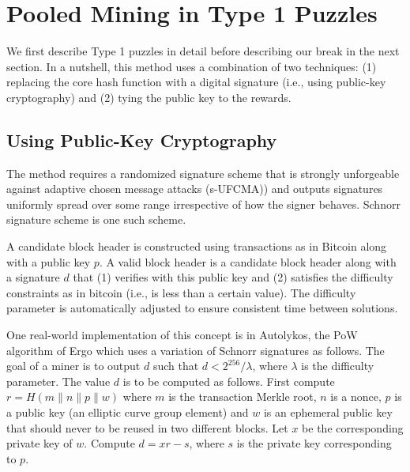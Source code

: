 \documentclass[11pt]{article}
\newcommand{\authnote}[2]{\marginpar{\parbox{\marginparwidth}{\tiny %
  \textsf{#1 {\textcolor{blue}{notes: #2}}}}}%
  \textcolor{blue}{\textbf{\dag}}}
\newcommand{\authnote}[2]{
  \textsf{#1 \textcolor{blue}{: #2}}}
\newcommand{\authnote}[2]{}
\newcommand{\snote}[1]{{\authnote{\textcolor{yellow}{Scalahub notes}}{#1}}}
\newcommand{\powname}{Autolykos\xspace}
\begin{document}
\section{Pooled Mining in Type 1 Puzzles}


We first describe Type 1 puzzles in detail before describing our break in the next section.
In a nutshell, this method uses a combination of two techniques: (1) replacing the core hash function with a digital signature (i.e., using public-key cryptography) and (2) tying the public key to the rewards. 

\subsection{Using Public-Key Cryptography}

The method requires a randomized signature scheme that is strongly unforgeable against adaptive chosen message attacks (s-UFCMA)) and outputs signatures uniformly spread over some range irrespective of how the signer behaves. Schnorr signature scheme is one such scheme.  

A candidate block header is constructed using transactions as in Bitcoin along with a public key $p$. A valid block header is a candidate block header along with a signature $d$ that (1) verifies with this public key and (2) satisfies the difficulty constraints as in bitcoin (i.e., is less than a certain value). The difficulty parameter is automatically adjusted to ensure consistent time between solutions. 

One real-world implementation of this concept is in \powname, the PoW algorithm of Ergo which uses a variation of Schnorr signatures as follows. The goal of a miner is to output $d$ such that $d < 2^{256}/\lambda$, where $\lambda$ is the difficulty parameter. The value $d$ is to be computed as follows. First compute $r = H(m\|n\|p\|w)$ where $m$ is the transaction Merkle root, $n$ is a nonce, $p$ is a public key (an elliptic curve group element) and $w$ is an ephemeral public key that should never to be reused in two different blocks. Let $x$ be the corresponding private key of $w$. Compute $d = xr - s$, where $s$ is the private key corresponding to $p$.


\end{document}
